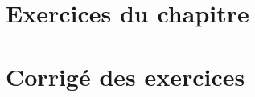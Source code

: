 \section{Exercices du chapitre}
\small

\setcounter{numexos}{0}
\normalsize
\newpage
\restoregeometry
\captionsetup{width=0.9\linewidth}
\section{Corrigé des exercices}
\small

\normalsize
\restoregeometry
\captionsetup{width=0.9\linewidth}

